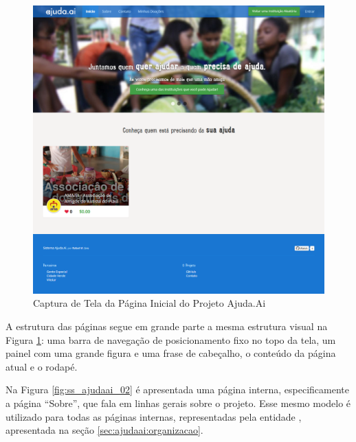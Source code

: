 \begin{figure}[H]
	\caption{\label{fig:ss_ajudaai_01}Captura de Tela da Página Inicial do Projeto Ajuda.Ai}
    \centering
    \includegraphics[scale=0.45]{imagens/screenshot-ajudaai-01.png}
\end{figure}

A estrutura das páginas segue em grande parte a mesma estrutura visual na Figura \ref{fig:ss_ajudaai_01}: uma barra de navegação de posicionamento fixo no topo da tela, um painel com uma grande figura e uma frase de cabeçalho, o conteúdo da página atual e o rodapé.

Na Figura \ref{fig:ss_ajudaai_02} é apresentada uma página interna, especificamente a página ``Sobre'', que fala em linhas gerais sobre o projeto. Esse mesmo modelo é utilizado para todas as páginas internas, representadas pela entidade , apresentada na seção \ref{sec:ajudaai:organizacao}.


